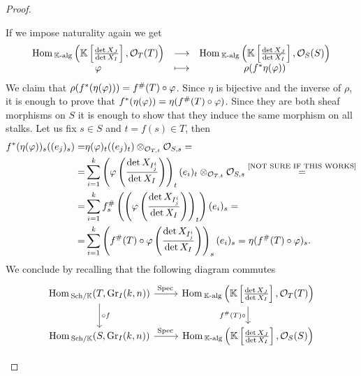 \begin{proof}
\begin{itemize}
\noindent
If we impose naturality again we get
\[\begin{array}{ccc} {\mathrm{Hom}\,_{\mathbb{K}\text{-alg}}\left({\mathbb{K}\left[{\frac{\det X_J}{\det X_I}}\right],\mathcal{O}_T(T)}\right)} & \longrightarrow & {\mathrm{Hom}\,_{\mathbb{K}\text{-alg}}\left({\mathbb{K}\left[{\frac{\det X_J}{\det X_I}}\right],\mathcal{O}_S(S)}\right)}\\ {\varphi} & \longmapsto & {\rho(f^\ast\eta(\varphi))} \end{array}\]
We claim that $\rho(f^\ast(\eta(\varphi)))=f^\#(T)\circ \varphi$. Since $\eta$ is bijective and the inverse of $\rho$, it is enough to prove that $f^\ast(\eta(\varphi))=\eta(f^\#(T)\circ \varphi)$. Since they are both sheaf morphisms on $S$ it is enough to show that they induce the same morphism on all stalks. Let us fix $s\in S$ and $t=f(s)\in T$, then
\begin{align*}
f^\ast(\eta(\varphi))_s((e_j)_s)=&\eta(\varphi)_t((e_j)_t)\otimes_{\mathcal{O}_{T,t}}\mathcal{O}_{S,s}=\\
=&\sum_{i=1}^k \left({\varphi\left({\frac{\det X_{I^i_j}}{\det X_I}}\right)}\right)_t (e_i)_t\otimes_{\mathcal{O}_{T,t}}\mathcal{O}_{S,s}\overset{\text{[NOT SURE IF THIS WORKS]}}=\\
=&\sum_{i=1}^k f^\#_s\left({\left({\varphi\left({\frac{\det X_{I^i_j}}{\det X_I}}\right)}\right)_t}\right) (e_i)_s=\\
=&\sum_{i=1}^k \left({f^\#(T)\circ \varphi\left({\frac{\det X_{I^i_j}}{\det X_I}}\right)}\right)_s (e_i)_s=\eta(f^\#(T)\circ \varphi)_s.
\end{align*}
We conclude by recalling that the following diagram commutes
\[\begin{tikzcd}
	{\Hom_{\Sch\K}(T,\Gr_I(k,n))} & {\Hom_{\K\text{-alg}}\pa{\K\spa{\frac{\det X_J}{\det X_I}},\Oc_T(T)}} \\
	{\Hom_{\Sch\K}(S,\Gr_I(k,n))} & {\Hom_{\K\text{-alg}}\pa{\K\spa{\frac{\det X_J}{\det X_I}},\Oc_S(S)}}
	\arrow["\Spec", from=1-1, to=1-2]
	\arrow["{\circ f}", from=1-1, to=2-1]
	\arrow["{f^\#(T)\circ}"', from=1-2, to=2-2]
	\arrow["\Spec", from=2-1, to=2-2]
\end{tikzcd}\]
\end{itemize}
\setlength{\leftmargini}{0.5cm}
\end{proof}

